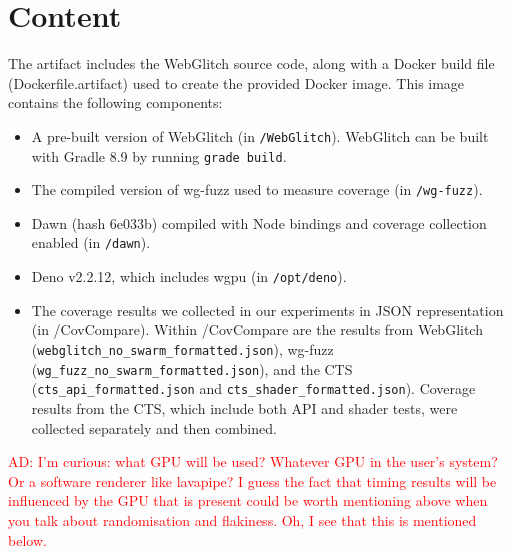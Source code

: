 \documentclass[a4paper,UKenglish]{darts-v2021}
\newenvironment{content}{\section{Content}}{}
\newcommand{\AD}[1]{\textcolor{red}{AD: #1}}
\begin{document}
\begin{content}
The artifact includes the WebGlitch source code, along with a Docker build file (Dockerfile.artifact) used to create the provided Docker image. This image contains the following components:
\begin{itemize}
    \item A pre-built version of WebGlitch (in \texttt{/WebGlitch}). WebGlitch can be built with Gradle 8.9 by running \texttt{grade build}.
    \item The compiled version of wg-fuzz used to measure coverage (in \texttt{/wg-fuzz}).
    \item Dawn (hash 6e033b) compiled with Node bindings and coverage collection enabled (in \texttt{/dawn}). 
    \item Deno v2.2.12, which includes wgpu (in \texttt{/opt/deno}).
    \item The coverage results we collected in our experiments in JSON representation (in /CovCompare). Within /CovCompare are the results from WebGlitch (\texttt{webglitch\_no\_swarm\_formatted.json}), wg-fuzz (\texttt{wg\_fuzz\_no\_swarm\_formatted.json}), and the CTS (\texttt{cts\_api\_formatted.json} and \texttt{cts\_shader\_formatted.json}). Coverage results from the CTS, which include both API and shader tests, were collected separately and then combined.
\end{itemize}
\end{content}

\AD{I'm curious: what GPU will be used? Whatever GPU in the user's system? Or a software renderer like lavapipe? I guess the fact that timing results will be influenced by the GPU that is present could be worth mentioning above when you talk about randomisation and flakiness. Oh, I see that this is mentioned below.}
\end{document}

